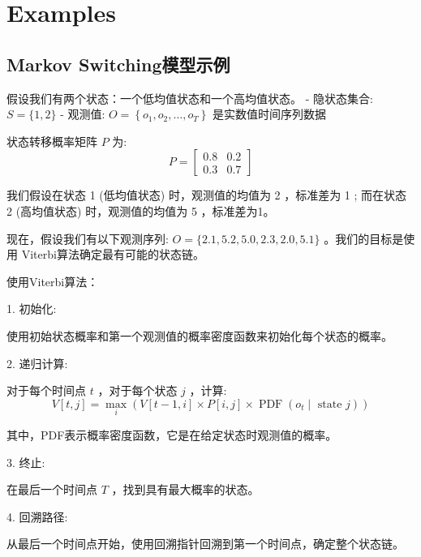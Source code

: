 \documentclass[UTF8,12pt]{ctexart}
\numberwithin{equation}{section}%
\begin{document}
	\section{Examples}
	\subsection{Markov Switching模型示例}
	假设我们有两个状态：一个低均值状态和一个高均值状态。
	- 隐状态集合: $S=\{1,2\}$
	- 观测值: $O=\left\{o_1, o_2, \ldots, o_T\right\}$ 是实数值时间序列数据
	
	状态转移概率矩阵 $P$ 为:
	$$
	P=\left[\begin{array}{ll}
		0.8 & 0.2 \\
		0.3 & 0.7
	\end{array}\right]
	$$
	
	我们假设在状态 1 (低均值状态) 时，观测值的均值为 2 ，标准差为 1 ; 而在状态 2 (高均值状态) 时，观测值的均值为 5 ，标准差为1。
	
	现在，假设我们有以下观测序列: $O=\{2.1,5.2,5.0,2.3,2.0,5.1\}$ 。我们的目标是使用 Viterbi算法确定最有可能的状态链。
	
	使用Viterbi算法：
	
	1. 初始化:
	
	使用初始状态概率和第一个观测值的概率密度函数来初始化每个状态的概率。
	
	2. 递归计算:
	
	对于每个时间点 $t$ ，对于每个状态 $j$ ，计算:
	$$
	V[t, j]=\max _i\left(V[t-1, i] \times P[i, j] \times \operatorname{PDF}\left(o_t \mid \text { state } j\right)\right)
	$$
	
	其中，PDF表示概率密度函数，它是在给定状态时观测值的概率。
	
	3. 终止:
	
	在最后一个时间点 $T$ ，找到具有最大概率的状态。
	
	4. 回溯路径:
	
	从最后一个时间点开始，使用回溯指针回溯到第一个时间点，确定整个状态链。
	
\end{document}
